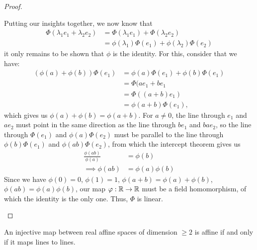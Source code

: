 \begin{proof}
\begin{enumerate}
		\newpar
		Putting our insights together, we now know that
		\begin{align*}
			\Phi(\lambda_1 e_1 + \lambda_2 e_2)
			&= \Phi(\lambda_1 e_1) + \Phi(\lambda_2 e_2)\\ 
			&= \phi(\lambda_1) \Phi(e_1) + \phi(\lambda_2) \Phi(e_2)
		\end{align*}
		it only remains to be shown that $\phi$ is the identity. For this, consider that we have:
		\begin{align*}
			(\phi(a) + \phi(b))\Phi(e_1)
			&= \phi(a) \Phi(e_1) + \phi(b) \Phi(e_1)\\
			&= \Phi(ae_1 + be_1\\
			&= \Phi((a+b)e_1)\\ 
			&= \phi(a+b) \Phi(e_1),
		\end{align*}
		which gives us $\phi(a) + \phi(b) = \phi(a+b)$. For $a \neq 0$, the line through $e_1$ and $ae_2$ must point in the same direction as the line through $be_1$ and $bae_2$, so the line through $\Phi(e_1)$ and $\phi(a) \Phi(e_2)$ must be parallel to the line through $\phi(b)\Phi(e_1)$ and $\phi(ab)\Phi(e_2)$, from which the intercept theorem gives us
		\begin{align*}
			\frac{\phi(ab)}{\phi(a)} &= \phi(b)\\
			\implies \phi(ab) &= \phi(a) \phi(b)
		\end{align*}
		Since we have $\phi(0) = 0$, $\phi(1) = 1$, $\phi(a + b) = \phi(a) + \phi(b)$, $\phi(ab) = \phi(a)\phi(b)$,
		our map $\varphi : \mathbb{R} \to \mathbb{R}$ must be a field homomorphism, of which the identity is the only one. Thus, $\Phi$ is linear.
	\end{enumerate}
\end{proof}
\begin{exercise}
	An injective map between real affine spaces of dimension $\geq 2$ is affine if and only if it maps lines to lines.
\end{exercise}

